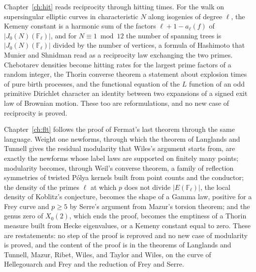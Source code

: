 Chapter~\ref{ch:hit} reads reciprocity through hitting times. For the walk on supersingular elliptic curves in characteristic $N$ along isogenies of degree $\ell$, the Kemeny constant is a harmonic sum of the factors $\ell+1-a_\ell(f)$ of $|J_0(N)(\mathbb F_\ell)|$, and for $N\equiv1\bmod12$ the number of spanning trees is $|J_0(N)(\mathbb F_\ell)|$ divided by the number of vertices, a formula of Hashimoto \cite{hashimoto1989,li2019} that Munier and Shnidman \cite{muniershnidman2023} read as a reciprocity law exchanging the two primes. Chebotarev densities become hitting rates for the largest prime factors of a random integer, the Thorin converse theorem a statement about explosion times of pure birth processes, and the functional equation of the $L$ function of an odd primitive Dirichlet character an identity between two expansions of a signed exit law of Brownian motion. These too are reformulations, and no new case of reciprocity is proved.

Chapter~\ref{ch:flt} follows the proof of Fermat's last theorem through the same language. Weight one newforms, through which the theorem of Langlands and Tunnell gives the residual modularity that Wiles's argument starts from, are exactly the newforms whose label laws are supported on finitely many points; modularity becomes, through Weil's converse theorem, a family of reflection symmetries of twisted P\'olya kernels built from point counts and the conductor; the density of the primes $\ell$ at which $p$ does not divide $|E(\mathbb F_\ell)|$, the local density of Koblitz's conjecture, becomes the shape of a Gamma law, positive for a Frey curve and $p\ge5$ by Serre's argument from Mazur's torsion theorem; and the genus zero of $X_0(2)$, which ends the proof, becomes the emptiness of a Thorin measure built from Hecke eigenvalues, or a Kemeny constant equal to zero. These are restatements: no step of the proof is reproved and no new case of modularity is proved, and the content of the proof is in the theorems of Langlands and Tunnell, Mazur, Ribet, Wiles, and Taylor and Wiles, on the curve of Hellegouarch and Frey and the reduction of Frey and Serre.

